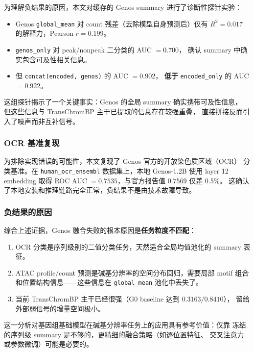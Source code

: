 \documentclass[11pt,a4paper]{ctexart}
\begin{document}
为理解负结果的原因，本文对缓存的 Genos summary 进行了诊断性探针实验：

\begin{itemize}[leftmargin=2em]
  \item Genos \texttt{global\_mean} 对 count 残差（去除模型自身预测后）仅有
  $R^2 = 0.017$ 的解释力，Pearson $r = 0.199$。
  \item \texttt{genos\_only} 对 peak/nonpeak 二分类的 AUC $= 0.700$，
  确认 summary 中确实包含可及性相关信息。
  \item 但 \texttt{concat(encoded, genos)} 的 AUC $= 0.902$，
  \textbf{低于} \texttt{encoded\_only} 的 AUC $= 0.922$。
\end{itemize}

这组探针揭示了一个关键事实：Genos 的全局 summary 确实携带可及性信息，
但这些信息与 TransChromBP 主干已提取的信息存在较强重叠，
直接拼接反而引入了噪声而非互补信号。

\subsubsection{OCR 基准复现}

为排除实现错误的可能性，本文复现了 Genos 官方的开放染色质区域（OCR）
分类基准。在 \texttt{human\_ocr\_ensembl} 数据集上，本地 Genos-1.2B 使用
layer 12 embedding 取得 ROC AUC $= 0.7535$，与官方报告值 $0.7569$ 仅差 0.5\%。
这确认了本地安装和推理链路完全正常，负结果不是由技术故障导致。

\subsubsection{负结果的原因}

综合上述证据，Genos 融合失败的根本原因是\textbf{任务粒度不匹配}：

\begin{enumerate}[leftmargin=2em]
  \item OCR 分类是序列级别的二值分类任务，天然适合全局均值池化的 summary 表征。
  \item ATAC profile/count 预测是碱基分辨率的空间分布回归，需要局部 motif 组合
  和位置结构信息——这些信息在 \texttt{global\_mean} 池化中丢失了。
  \item 当前 TransChromBP 主干已经很强（G0 baseline 达到 $0.3163 / 0.8410$），
  留给外部弱信号的增量空间极小。
\end{enumerate}

这一分析对基因组基础模型在碱基分辨率任务上的应用具有参考价值：仅靠
冻结的序列级 summary 是不够的，更精细的融合策略（如逐位置特征、
交叉注意力或参数微调）可能是必要的。
\end{document}

